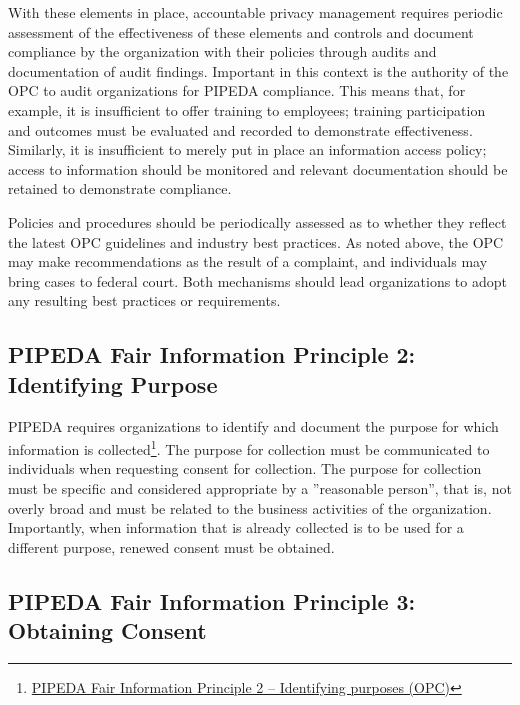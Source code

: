 With these elements in place, accountable privacy management requires periodic assessment of the effectiveness of these elements and controls and document compliance by the organization with their policies through audits and documentation of audit findings. Important in this context is the authority of the OPC to audit organizations for PIPEDA compliance. This means that, for example, it is insufficient to offer training to employees; training participation and outcomes must be evaluated and recorded to demonstrate effectiveness. Similarly, it is insufficient to merely put in place an information access policy; access to information should be monitored and relevant documentation should be retained to demonstrate compliance. 

Policies and procedures should be periodically assessed as to whether they reflect the latest OPC guidelines and industry best practices. As noted above, the OPC may make recommendations as the result of a complaint, and individuals may bring cases to federal court. Both mechanisms should lead organizations to adopt any resulting best practices or requirements. 

\subsection*{PIPEDA Fair Information Principle 2: Identifying Purpose}

PIPEDA requires organizations to identify and document the purpose for which information is collected\footnote{\href{https://www.priv.gc.ca/en/privacy-topics/privacy-laws-in-canada/the-personal-information-protection-and-electronic-documents-act-pipeda/p_principle/principles/p_purposes/}{PIPEDA Fair Information Principle 2 -- Identifying purposes (OPC)}}. The purpose for collection must be communicated to individuals when requesting consent for collection. The purpose for collection must be specific and considered appropriate by a ''reasonable person'', that is, not overly broad and must be related to the business activities of the organization. Importantly, when information that is already collected is to be used for a different purpose, renewed consent must be obtained. 

\subsection*{PIPEDA Fair Information Principle 3: Obtaining Consent}

